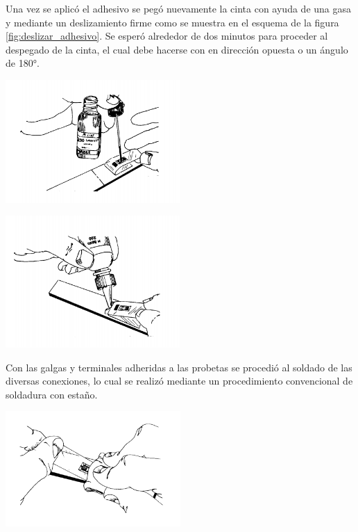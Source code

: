 Una vez se aplicó el adhesivo se pegó nuevamente la cinta con ayuda de una gasa y mediante un deslizamiento firme 
como se muestra en el esquema de la figura \ref{fig:deslizar_adhesivo}. Se esperó alrededor 
de dos minutos para proceder al despegado de la cinta, el cual debe hacerse con en dirección opuesta 
o un ángulo de 180°.

\begin{center}
\includegraphics[width=0.5\textwidth]{src/ch3/aplicacion_catalizador.png}
\label{fig:aplicacion_catalizador}
\end{center}

\begin{center}
\includegraphics[width=0.5\textwidth]{src/ch3/aplicacion_adhesivo.png}
\label{fig:aplicacion_adhesivo}
\end{center}

Con las galgas y terminales adheridas a las probetas se procedió al soldado de las diversas conexiones, lo 
cual se realizó mediante un procedimiento convencional de soldadura con estaño.

\begin{center}
\includegraphics[width=0.5\textwidth]{src/ch3/deslizar_adhesivo.png}
\label{fig:deslizar_adhesivo}
\end{center}

